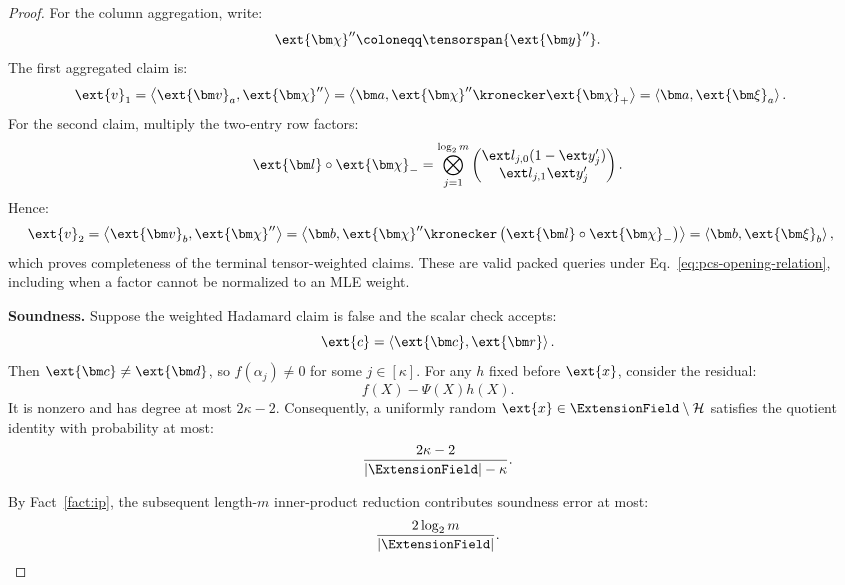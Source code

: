 \begin{proof}
For the column aggregation, write:
\[
    \ext{\bm\chi}''
    \coloneqq
    \tensorspan{\ext{\bm y}''}.
\]
The first aggregated claim is:
\[
\begin{aligned}
    \ext{v}_1
    &=
    \left\langle
        \ext{\bm v}_a,\ext{\bm\chi}''
    \right\rangle
    =
    \left\langle
        \bm a,
        \ext{\bm\chi}''
        \kronecker
        \ext{\bm\chi}_+
    \right\rangle
    =
    \left\langle
        \bm a,
        \ext{\bm\xi}_a
    \right\rangle.
\end{aligned}
\]
For the second claim, multiply the two-entry row factors:
\[
    \ext{\bm l}\circ\ext{\bm\chi}_-
    =
    \bigotimes_{j=1}^{\log_2m}
    \begin{pmatrix}
        \ext l_{j,0}(1-\ext y'_j)\\
        \ext l_{j,1}\ext y'_j
    \end{pmatrix}.
\]
Hence:
\[
\begin{aligned}
    \ext{v}_2
    &=
    \left\langle
        \ext{\bm v}_b,\ext{\bm\chi}''
    \right\rangle
    =
    \left\langle
        \bm b,
        \ext{\bm\chi}''
        \kronecker
        \left(
            \ext{\bm l}\circ\ext{\bm\chi}_-
        \right)
    \right\rangle
    =
    \left\langle
        \bm b,
        \ext{\bm\xi}_b
    \right\rangle,
\end{aligned}
\]
which proves completeness of the terminal tensor-weighted claims.
These are valid packed queries under
Eq.~\eqref{eq:pcs-opening-relation}, including when a factor
cannot be normalized to an MLE weight.

\smallskip\noindent\textbf{Soundness.}
Suppose the weighted Hadamard claim is false and the scalar check
accepts:
\[
    \ext{c}
    =
    \left\langle
        \ext{\bm c},\ext{\bm r}
    \right\rangle.
\]
Then \(\ext{\bm c}\neq\ext{\bm d}\), so \(f(\alpha_j)\neq0\)
for some \(j\in[\kappa]\). For any \(h\) fixed before
\(\ext{x}\), consider the residual:
\[
    f(X)-\Psi(X)h(X).
\]
It is nonzero and has degree at most \(2\kappa-2\).
Consequently, a uniformly random
\(\ext{x}\in\ExtensionField\setminus\mathcal H\) satisfies the
quotient identity with probability at most:
\[
    \frac{2\kappa-2}
         {|\ExtensionField|-\kappa}.
\]

By Fact~\ref{fact:ip}, the subsequent length-\(m\)
inner-product reduction contributes soundness error at most:
\[
    \frac{2\log_2m}
         {|\ExtensionField|}.
\]


\end{proof}
